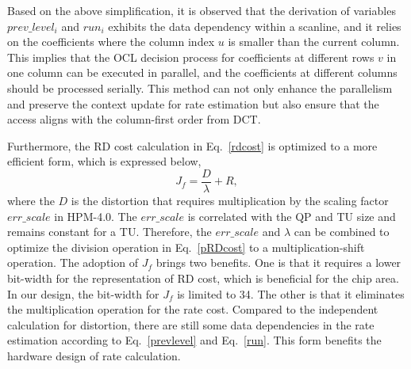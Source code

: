 \documentclass[lettersize,journal]{IEEEtran}
\begin{document}
Based on the above simplification, it is observed that the derivation of variables $prev\_level_{i}$ and $run_{i}$ exhibits the data dependency within a scanline, and it relies on the coefficients where the column index $u$ is smaller than the current column. This implies that the OCL decision process for coefficients at different rows $v$ in one column can be executed in parallel, and the coefficients at different columns should be processed serially. This method can not only enhance the parallelism and preserve the context update for rate estimation but also ensure that the access aligns with the column-first order from DCT. 

Furthermore, the RD cost calculation in Eq.~\eqref{rdcost} is optimized to a more efficient form, which is expressed below, 
\begin{equation}
    J_{f} =\frac{D}{\lambda } + R,
	\label{pRDcost}
\end{equation}
where the $D$ is the distortion that requires multiplication by the scaling factor $err\_scale$ in HPM-4.0. The $err\_scale$ is correlated with the QP and TU size and remains constant for a TU. Therefore, the $err\_scale$ and $\lambda$ can be combined to optimize the division operation in Eq.~\eqref{pRDcost} to a multiplication-shift operation. The adoption of $J_{f}$ brings two benefits. One is that it requires a lower bit-width for the representation of RD cost, which is beneficial for the chip area. In our design, the bit-width for $J_{f}$ is limited to 34. The other is that it eliminates the multiplication operation for the rate cost. Compared to the independent calculation for distortion, there are still some data dependencies in the rate estimation according to Eq.~\eqref{prevlevel} and Eq.~\eqref{run}. This form benefits the hardware design of rate calculation. 
\end{document}
